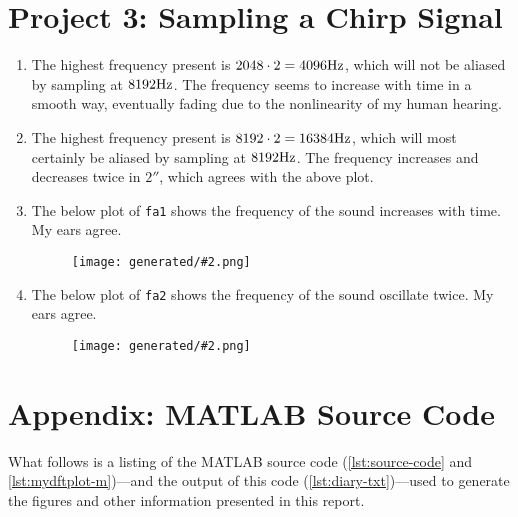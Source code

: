 \documentclass{ajhlabreport}
\newcommand{\generatedfigw}[2]{
	\texttt{[image: generated/\#2.png]}
}
\begin{document}
\chapter{Project 3: Sampling a Chirp Signal}

\renewcommand{\labelenumi}{(\alph{enumi})}
\begin{enumerate}
%
\item The highest frequency present is $2048 \cdot 2 = 4096\hertz$, which will
not be aliased by sampling at $8192\hertz$. The frequency seems to increase with
time in a smooth way, eventually fading due to the nonlinearity of my human
hearing.
%
\item The highest frequency present is $8192 \cdot 2 = 16384\hertz$, which will
most certainly be aliased by sampling at $8192\hertz$. The frequency increases
and decreases twice in $2\second$, which agrees with the above plot.
%
\item The below plot of \texttt{fa1} shows the frequency of the sound increases with
time. My ears agree.
\begin{figure}[H]
\centering
\generatedfigw{0.9}{p3-1}
\end{figure}
%
\item The below plot of \texttt{fa2} shows the frequency of the sound oscillate
twice. My ears agree.
\begin{figure}[H]
\centering
\generatedfigw{0.9}{p3-2}
\end{figure}
%
\end{enumerate}



\newpage
\chapter{Appendix: MATLAB Source Code}

What follows is a listing of the MATLAB source code (\autoref{lst:source-code}
and \autoref*{lst:mydftplot-m})---and the output of this code
(\autoref{lst:diary-txt})---used to generate the figures and other information
presented in this report.




\end{document}
